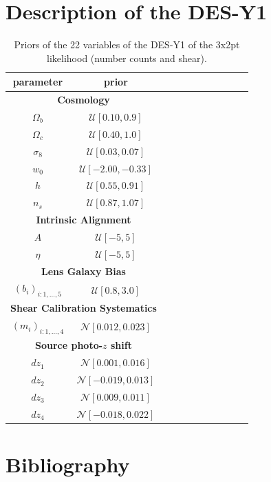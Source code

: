 \documentclass[final,5p,times,twocolumn,authoryear]{elsarticle}
\begin{document}
\section{Description of the DES-Y1}
\label{app-DESY1}
\begin{table}[htb]
\caption{Priors of the 22 variables of the DES-Y1 of the 3x2pt likelihood (number counts and shear).}
\label{tab-DESY1}
 \centering
\begin{tabular}{ccccccccccc}
\hline
 parameter &  prior \\
 \hline
  \multicolumn{2}{c}{\textbf{Cosmology}} \\
$\Omega_b$ & $\mathcal{U}[0.10, 0.9]$ \\
$\Omega_c$ & $\mathcal{U}[0.40, 1.0]$ \\
$\sigma_8$ & $\mathcal{U}[0.03, 0.07]$ \\
$w_0$ & $\mathcal{U}[-2.00, -0.33]$ \\
$h$ & $\mathcal{U}[0.55, 0.91]$ \\
$n_s$ & $\mathcal{U}[0.87, 1.07]$ \\
\multicolumn{2}{c}{\textbf{Intrinsic Alignment}} \\
$A$ & $\mathcal{U}[-5,5]$ \\
$\eta$ &$\mathcal{U}[-5,5]$ \\
\multicolumn{2}{c}{\textbf{Lens Galaxy Bias}} \\
$(b_i)_{i:1,\dots,5}$ & $\mathcal{U}[0.8,3.0]$ \\
\multicolumn{2}{c}{\textbf{Shear Calibration Systematics}} \\
$(m_i)_{i:1,\dots,4}$ & $\mathcal{N}[0.012,0.023]$ \\
\multicolumn{2}{c}{\textbf{Source photo-$z$ shift}} \\
$dz_1$ & $\mathcal{N}[0.001,0.016]$ \\
$dz_2$ & $\mathcal{N}[-0.019,0.013]$ \\
$dz_3$ & $\mathcal{N}[0.009,0.011]$ \\
$dz_4$ & $\mathcal{N}[-0.018,0.022]$ \\
\hline
\end{tabular}
\end{table}



\section*{Bibliography}
 


\end{document}
